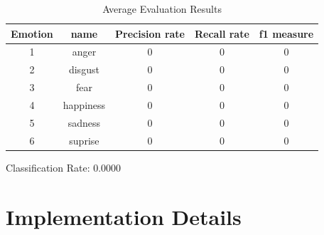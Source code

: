 \documentclass[11pt]{article}
\begin{document}
\begin{table}[H]
\caption{Average Evaluation Results} %
\centering %
\begin{tabular}{c c c c c} %
\hline\hline %
Emotion & name & Precision rate & Recall rate & f1 measure\\ [0.5ex] %
\hline %
1 & anger     & 0 & 0 & 0\\ %
2 & disgust   & 0 & 0 & 0\\
3 & fear      & 0 & 0 & 0\\
4 & happiness & 0 & 0 & 0\\
5 & sadness   & 0 & 0 & 0\\ 
6 & suprise   & 0 & 0 & 0\\ [1ex] %
\hline %
\end{tabular}
\label{table:sixevaluation} %
\end{table}

Classification Rate: 0.0000


\section{Implementation Details}
\end{document}
